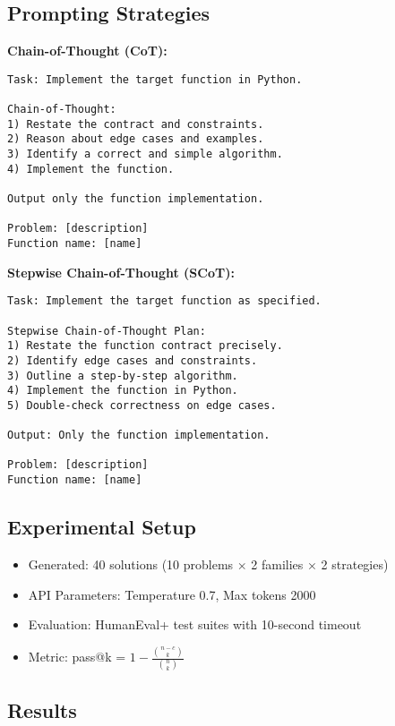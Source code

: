 \documentclass[11pt]{article}
\begin{document}
\subsection{Prompting Strategies}

\textbf{Chain-of-Thought (CoT):}
\begin{lstlisting}
Task: Implement the target function in Python.

Chain-of-Thought:
1) Restate the contract and constraints.
2) Reason about edge cases and examples.
3) Identify a correct and simple algorithm.
4) Implement the function.

Output only the function implementation.

Problem: [description]
Function name: [name]
\end{lstlisting}

\textbf{Stepwise Chain-of-Thought (SCoT):}
\begin{lstlisting}
Task: Implement the target function as specified.

Stepwise Chain-of-Thought Plan:
1) Restate the function contract precisely.
2) Identify edge cases and constraints.
3) Outline a step-by-step algorithm.
4) Implement the function in Python.
5) Double-check correctness on edge cases.

Output: Only the function implementation.

Problem: [description]
Function name: [name]
\end{lstlisting}

\subsection{Experimental Setup}

\begin{itemize}
    \item Generated: 40 solutions (10 problems $\times$ 2 families $\times$ 2 strategies)
    \item API Parameters: Temperature 0.7, Max tokens 2000
    \item Evaluation: HumanEval+ test suites with 10-second timeout
    \item Metric: pass@k = $1 - \frac{\binom{n-c}{k}}{\binom{n}{k}}$
\end{itemize}

\subsection{Results}
\end{document}
